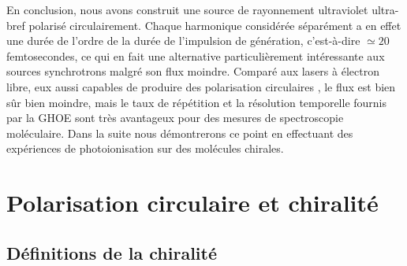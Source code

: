 En conclusion, nous avons construit une source de rayonnement ultraviolet ultra-bref polarisé circulairement. Chaque harmonique considérée séparément a en effet une durée de l'ordre de la durée de l'impulsion de génération, c'est-à-dire $\simeq 20$ femtosecondes, ce qui en fait une alternative particulièrement intéressante aux sources synchrotrons malgré son flux moindre. Comparé aux lasers à électron libre, eux aussi capables de produire des polarisation circulaires , le flux est bien sûr bien moindre, mais le taux de répétition et la résolution temporelle fournis par la GHOE sont très avantageux pour des mesures de spectroscopie moléculaire. Dans la suite nous démontrerons ce point en effectuant des expériences de photoionisation sur des molécules chirales. 
%
\chapter{Polarisation circulaire et chiralité}
\section{Définitions de la chiralité}
